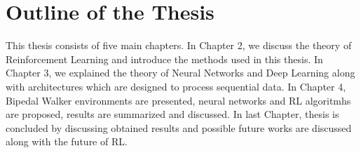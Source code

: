 \section{Outline of the Thesis}
\label{sec:outline}
This thesis consists of five main chapters. 
In Chapter 2, we discuss the theory of Reinforcement Learning and introduce the methods used in this thesis.
In Chapter 3, we explained the theory of Neural Networks and Deep Learning along with architectures which are designed to process sequential data. 
In Chapter 4, Bipedal Walker environments are presented, neural networks and RL algoritmhs are proposed, results are summarized and discussed.
In last Chapter, thesis is concluded by discussing obtained results and possible future works are discussed along with the future of RL.
